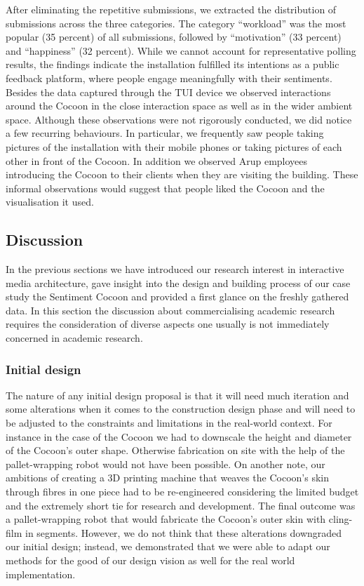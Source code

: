 After eliminating the repetitive submissions, we extracted the distribution of submissions across the three categories. The category “workload” was the most popular (35 percent) of all submissions, followed by “motivation” (33 percent) and “happiness” (32 percent). While we cannot account for representative polling results, the findings indicate the installation fulfilled its intentions as a public feedback platform, where people engage meaningfully with their sentiments. Besides the data captured through the TUI device we observed interactions around the Cocoon in the close interaction space as well as in the wider ambient space. Although these observations were not rigorously conducted, we did notice a few recurring behaviours. In particular, we frequently saw people taking pictures of the installation with their mobile phones or taking pictures of each other in front of the Cocoon. In addition we observed Arup employees introducing the Cocoon to their clients when they are visiting the building. These informal observations would suggest that people liked the Cocoon and the visualisation it used.

\subsection{Discussion}

In the previous sections we have introduced our research interest in interactive media architecture, gave insight into the design and building process of our case study the Sentiment Cocoon and provided a first glance on the freshly gathered data.
In this section the discussion about commercialising academic research requires the consideration of diverse aspects one usually is not immediately concerned in academic research.

\subsubsection*{Initial design}

The nature of any initial design proposal is that it will need much iteration and some alterations when it comes to the construction design phase and will need to be adjusted to the constraints and limitations in the real-world context. For instance in the case of the Cocoon we had to downscale the height and diameter of the Cocoon’s outer shape. Otherwise fabrication on site with the help of the pallet-wrapping robot would not have been possible. On another note, our ambitions of creating a 3D printing machine that weaves the Cocoon’s skin through fibres in one piece had to be re-engineered considering the limited budget and the extremely short tie for research and development. The final outcome was a pallet-wrapping robot that would fabricate the Cocoon’s outer skin with cling-film in segments. However, we do not think that these alterations downgraded our initial design; instead, we demonstrated that we were able to adapt our methods for the good of our design vision as well for the real world implementation. 

